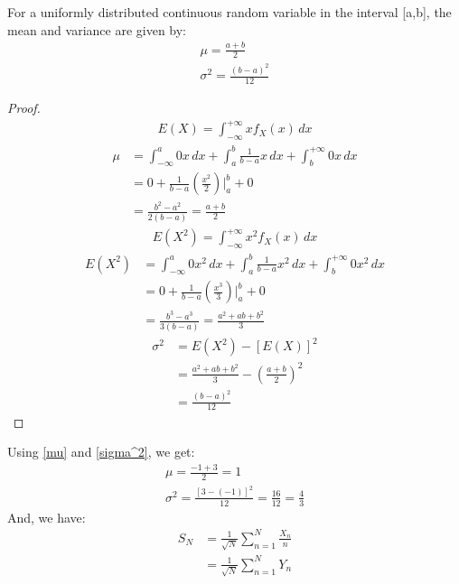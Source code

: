 \documentclass[journal,12pt,twocolumn]{IEEEtran}
\begin{document}
\begin{lemma} 
For a uniformly distributed continuous random variable in the interval [a,b], the mean and variance are given by:
\begin{align}
    \mu = \frac{a+b}{2} \label{mu}\\
    \sigma^2 = \frac{(b-a)^2}{12} \label{sigma^2}
\end{align}
\end{lemma}
\begin{proof}
\begin{align}
       E(X) = \int_{-\infty}^{+\infty} xf_X(x) \,dx
\end{align}
\begin{align}      
     \mu &= \int_{-\infty}^{a} 0 x \,dx + \int_{a}^{b} \frac{1}{b-a} x \,dx + \int_{b}^{+\infty} 0 x \,dx\\
     &= 0 + \frac{1}{b-a} \left(\frac{x^2}{2}\right)\Bigr|_{a}^{b} + 0 \\
     &= \frac{b^2 - a^2}{2(b - a)} = \frac{a+b}{2}
\end{align}
\begin{align}      
       E(X^2) = \int_{-\infty}^{+\infty} x^2f_X(x) \,dx
\end{align}
\begin{align}      
     E(X^2) &= \int_{-\infty}^{a} 0 x^2 \,dx + \int_{a}^{b} \frac{1}{b-a} x^2 \,dx + \int_{b}^{+\infty} 0 x^2 \,dx\\
     &= 0 + \frac{1}{b-a} \left(\frac{x^3}{3}\right)\Bigr|_{a}^{b} + 0 \\
     &= \frac{b^3 - a^3}{3(b - a)} = \frac{a^2 + ab + b^2}{3}
\end{align}   
\begin{align}
       \sigma^2 &= E(X^2) - [E(X)]^2 \\
       &= \frac{a^2 + ab + b^2}{3} - \left(\frac{a+b}{2}\right)^2\\
       &= \frac{(b-a)^2}{12}
\end{align}

\end{proof}
Using \eqref{mu} and \eqref{sigma^2}, we get:
\begin{align}
    \mu = \frac{-1 + 3}{2} = 1\\
    \sigma^2 = \frac{[3 - (-1)]^2}{12} = \frac{16}{12} = \frac{4}{3}
\end{align}
And, we have:
\begin{align}
  S_N &= \frac{1}{\sqrt{N}} \sum_{n=1}^N \frac{X_n}{n} \\
      &= \frac{1}{\sqrt{N}} \sum_{n=1}^N Y_n
\end{align}
\end{document}
